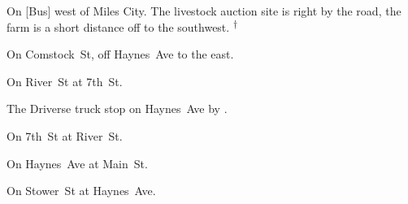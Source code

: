 

\begin{LocationList}

On [Bus] west of Miles City.
The livestock auction site is right by the road, the farm is a short distance off to the southwest.%
\textsuperscript{\scriptsize $\dagger$}

On Comstock~St, off  Haynes~Ave to the east.

On River~St at  7th~St.

The Driverse truck stop on  Haynes~Ave by .

\Location{\GarageHQ \Garage}
On  7th~St at River~St.

On Haynes~Ave at  Main~St.

On Stower~St at  Haynes~Ave.

\end{LocationList}
